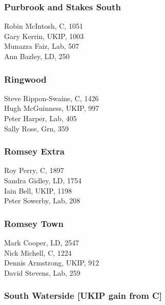 \documentclass[a4paper,openany,10pt]{book}
\begin{document}
\subsubsection*{Purbrook and Stakes South}



Robin McIntosh, C, 1051\\
Gary Kerrin, UKIP, 1003\\
Munazza Faiz, Lab, 507\\
Ann Bazley, LD, 250\\


\subsubsection*{Ringwood}



Steve Rippon-Swaine, C, 1426\\
Hugh McGuinness, UKIP, 997\\
Peter Harper, Lab, 405\\
Sally Rose, Grn, 359\\


\subsubsection*{Romsey Extra}



Roy Perry, C, 1897\\
Sandra Gidley, LD, 1754\\
Iain Bell, UKIP, 1198\\
Peter Sowerby, Lab, 208\\


\subsubsection*{Romsey Town}



Mark Cooper, LD, 2547\\
Nick Michell, C, 1224\\
Dennis Armstrong, UKIP, 912\\
David Stevens, Lab, 259\\


\subsubsection*{South Waterside \hspace*{\fill}\nolinebreak[1]%
\enspace\hspace*{\fill}
[UKIP gain from C]}
\end{document}
